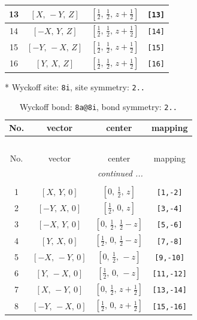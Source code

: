\documentclass[fleqn,8pt]{jsarticle}
\begin{document}
\begin{longtable}{cccc}
13 & $\left[ X,\, - Y,\, Z \right]$ & $\left[ \frac{1}{2},\, \frac{1}{2},\, z + \frac{1}{2} \right]$ & {\tt [13]} \\ \hline
14 & $\left[ - X,\, Y,\, Z \right]$ & $\left[ \frac{1}{2},\, \frac{1}{2},\, z + \frac{1}{2} \right]$ & {\tt [14]} \\ \hline
15 & $\left[ - Y,\, - X,\, Z \right]$ & $\left[ \frac{1}{2},\, \frac{1}{2},\, z + \frac{1}{2} \right]$ & {\tt [15]} \\ \hline
16 & $\left[ Y,\, X,\, Z \right]$ & $\left[ \frac{1}{2},\, \frac{1}{2},\, z + \frac{1}{2} \right]$ & {\tt [16]} \\
\end{longtable}
* Wyckoff site: {\tt 8i}, site symmetry: {\tt 2..}
\renewcommand{\arraystretch}{1.2}
\begin{longtable}{cccc}
\caption{Wyckoff bond: {\tt 8a@8i}, bond symmetry: {\tt 2..}}
 \\
 \hline \hline
No. & vector & center & mapping \\ \hline \endfirsthead

\multicolumn{3}{l}{\tablename\ \thetable{}} \\
 \hline \hline
No. & vector & center & mapping \\ \hline \endhead

 \hline \hline
\multicolumn{3}{r}{\footnotesize\it continued ...} \\ \endfoot

 \hline \hline
\multicolumn{3}{r}{} \\ \endlastfoot

1 & $\left[ X,\, Y,\, 0 \right]$ & $\left[ 0,\, \frac{1}{2},\, z \right]$ & {\tt [1,-2]} \\ \hline
2 & $\left[ - Y,\, X,\, 0 \right]$ & $\left[ \frac{1}{2},\, 0,\, z \right]$ & {\tt [3,-4]} \\ \hline
3 & $\left[ - X,\, Y,\, 0 \right]$ & $\left[ 0,\, \frac{1}{2},\, \frac{1}{2} - z \right]$ & {\tt [5,-6]} \\ \hline
4 & $\left[ Y,\, X,\, 0 \right]$ & $\left[ \frac{1}{2},\, 0,\, \frac{1}{2} - z \right]$ & {\tt [7,-8]} \\ \hline
5 & $\left[ - X,\, - Y,\, 0 \right]$ & $\left[ 0,\, \frac{1}{2},\, - z \right]$ & {\tt [9,-10]} \\ \hline
6 & $\left[ Y,\, - X,\, 0 \right]$ & $\left[ \frac{1}{2},\, 0,\, - z \right]$ & {\tt [11,-12]} \\ \hline
7 & $\left[ X,\, - Y,\, 0 \right]$ & $\left[ 0,\, \frac{1}{2},\, z + \frac{1}{2} \right]$ & {\tt [13,-14]} \\ \hline
8 & $\left[ - Y,\, - X,\, 0 \right]$ & $\left[ \frac{1}{2},\, 0,\, z + \frac{1}{2} \right]$ & {\tt [15,-16]} \\
\end{longtable}
\end{document}
